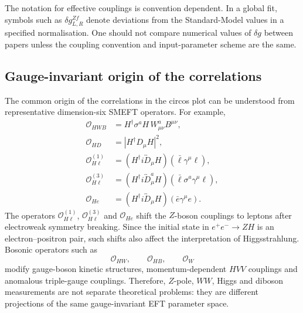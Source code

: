 \documentclass[11pt,a4paper]{report}
\newcommand{\ee}{e^+e^-}
\begin{document}
\begin{warningbox}
The notation for effective couplings is convention dependent.  In a global
fit, symbols such as \(\delta g^{Zf}_{L,R}\) denote deviations from the
Standard-Model values in a specified normalisation.  One should not compare
numerical values of \(\delta g\) between papers unless the coupling convention
and input-parameter scheme are the same.
\end{warningbox}

\subsection{Gauge-invariant origin of the correlations}
\label{subsec:gauge-invariant-origin-correlations}

The common origin of the correlations in the circos plot can be understood from
representative dimension-six SMEFT operators.  For example,
\begin{align}
	\mathcal O_{HWB}
	&=
	H^\dagger \sigma^a H\,W_{\mu\nu}^a B^{\mu\nu},
	\label{eq:OHWB-global}
	\\
	\mathcal O_{HD}
	&=
	\left|H^\dagger D_\mu H\right|^2,
	\label{eq:OHD-global}
	\\
	\mathcal O_{H\ell}^{(1)}
	&=
	\left(H^\dagger i\overleftrightarrow D_\mu H\right)
	\left(\bar\ell\gamma^\mu\ell\right),
	\label{eq:OHl1-global}
	\\
	\mathcal O_{H\ell}^{(3)}
	&=
	\left(H^\dagger i\overleftrightarrow D_\mu^a H\right)
	\left(\bar\ell\sigma^a\gamma^\mu\ell\right),
	\label{eq:OHl3-global}
	\\
	\mathcal O_{He}
	&=
	\left(H^\dagger i\overleftrightarrow D_\mu H\right)
	\left(\bar e\gamma^\mu e\right).
	\label{eq:OHe-global}
\end{align}
The operators \(\mathcal O_{H\ell}^{(1)}\), \(\mathcal O_{H\ell}^{(3)}\) and
\(\mathcal O_{He}\) shift the \(Z\)-boson couplings to leptons after
electroweak symmetry breaking.  Since the initial state in
\(\ee\to ZH\) is an electron--positron pair, such shifts also affect the
interpretation of Higgsstrahlung.  Bosonic operators such as
\begin{equation}
	\mathcal O_{HW},\qquad
	\mathcal O_{HB},\qquad
	\mathcal O_W
	\label{eq:bosonic-operators-global}
\end{equation}
modify gauge-boson kinetic structures, momentum-dependent \(HVV\) couplings
and anomalous triple-gauge couplings.  Therefore, \(Z\)-pole, \(WW\), Higgs
and diboson measurements are not separate theoretical problems: they are
different projections of the same gauge-invariant EFT parameter space.
\end{document}
